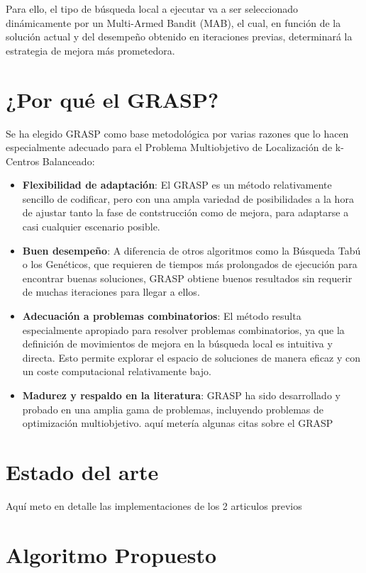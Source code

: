\documentclass[12pt,a4paper]{book}
\begin{document}
Para ello, el tipo de búsqueda local a ejecutar va a ser seleccionado dinámicamente por un Multi-Armed Bandit (MAB), el cual, en función de la solución actual y del desempeño obtenido en iteraciones previas, determinará la estrategia de mejora más prometedora.

\section{¿Por qué el GRASP?}
Se ha elegido GRASP como base metodológica por varias razones que lo hacen especialmente adecuado para el Problema Multiobjetivo de Localización de k-Centros Balanceado:
\begin{itemize}
    \item \textbf{Flexibilidad de adaptación}: El GRASP es un método relativamente sencillo de codificar, pero con una ampla variedad de posibilidades
    a la hora de ajustar tanto la fase de contstrucción como de mejora, para adaptarse a casi cualquier escenario posible. 
    \item \textbf{Buen desempeño}: A diferencia de otros algoritmos como la Búsqueda Tabú o los Genéticos, que requieren de tiempos más prolongados de ejecución para encontrar buenas soluciones,
    GRASP obtiene buenos resultados sin requerir de muchas iteraciones para llegar a ellos.
    \item \textbf{Adecuación a problemas combinatorios}: El método resulta especialmente apropiado para resolver problemas combinatorios, ya que la definición de movimientos de mejora en la búsqueda local es intuitiva y directa.
    Esto permite explorar el espacio de soluciones de manera eficaz y con un coste computacional relativamente bajo.
    \item \textbf{Madurez y respaldo en la literatura}: GRASP ha sido desarrollado y probado en una amplia gama de problemas, incluyendo problemas de optimización multiobjetivo. \color{red} aquí metería algunas citas sobre el GRASP\color{black}
\end{itemize}

\section{Estado del arte}
Aquí meto en detalle las implementaciones de los 2 articulos previos

\section{Algoritmo Propuesto}
\end{document}
